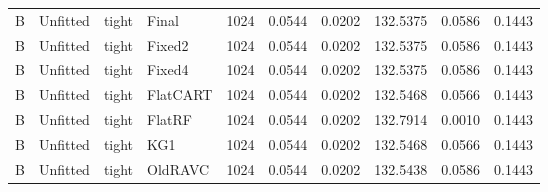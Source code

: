 \begin{longtable}{@{}llllllllll@{}}
B & Unfitted & tight & Final & 1024 & 0.0544 & 0.0202 & 132.5375 & 0.0586 & 0.1443\\
B & Unfitted & tight & Fixed2 & 1024 & 0.0544 & 0.0202 & 132.5375 & 0.0586 & 0.1443\\
B & Unfitted & tight & Fixed4 & 1024 & 0.0544 & 0.0202 & 132.5375 & 0.0586 & 0.1443\\
B & Unfitted & tight & FlatCART & 1024 & 0.0544 & 0.0202 & 132.5468 & 0.0566 & 0.1443\\
B & Unfitted & tight & FlatRF & 1024 & 0.0544 & 0.0202 & 132.7914 & 0.0010 & 0.1443\\
B & Unfitted & tight & KG1 & 1024 & 0.0544 & 0.0202 & 132.5468 & 0.0566 & 0.1443\\
B & Unfitted & tight & OldRAVC & 1024 & 0.0544 & 0.0202 & 132.5438 & 0.0586 & 0.1443\\
\bottomrule\end{longtable}\normalsize\setlength{\tabcolsep}{6pt}
